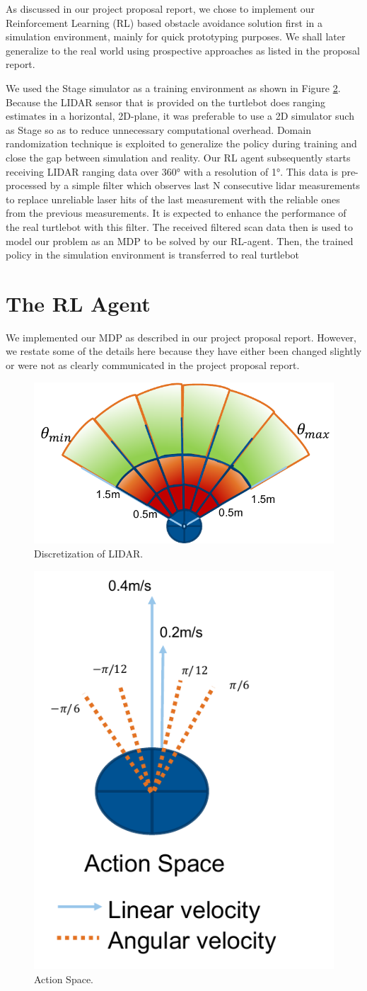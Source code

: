 \documentclass{article}
\begin{document}
As discussed in our project proposal report, we chose to implement our Reinforcement Learning (RL) based obstacle avoidance solution first in a simulation environment, mainly for quick prototyping purposes. We shall later generalize to the real world using prospective approaches as listed in the proposal report.

We used the Stage simulator as a training environment as shown in Figure \ref{fig:stage}. Because the LIDAR sensor that is provided on the turtlebot does ranging estimates in a horizontal, 2D-plane, it was preferable to use a 2D simulator such as Stage so as to reduce unnecessary computational overhead. Domain randomization technique is exploited to generalize the policy during training and close the gap between simulation and reality. Our RL agent subsequently starts receiving LIDAR ranging data over \ang{360} with a resolution of \ang{1}. This data is pre-processed by a simple filter which observes last N consecutive lidar measurements to replace unreliable laser hits of the last measurement with the reliable ones from the previous measurements. It is expected to enhance the performance of the real turtlebot with this filter. The received filtered scan data then is used to model our problem as an MDP to be solved by our RL-agent. Then, the trained policy in the simulation environment is transferred to real turtlebot 

\section{The RL Agent}
We implemented our MDP as described in our project proposal report. However, we restate some of the details here because they have either been changed slightly or were not as clearly communicated in the project proposal report.

\begin{figure}[ht]
 \centering
 \includegraphics[width=.4\textwidth]{lidar_discretization.pdf}
  \caption{Discretization of LIDAR.}
  \label{fig:stage}
\end{figure}

\begin{figure}[ht]
 \centering
 \includegraphics[width=.3\textwidth]{action_space.pdf}
  \caption{Action Space.}
  \label{fig:stage}
\end{figure}
        
\end{document}
